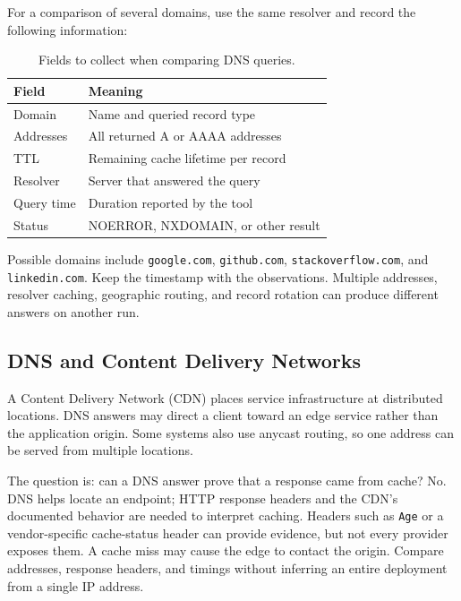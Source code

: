 \documentclass[journal]{IEEEtran}
\begin{document}
For a comparison of several domains, use the same resolver and record the following information:
\begin{table}[t]
\centering
\caption{Fields to collect when comparing DNS queries.}
\begin{tabularx}{\columnwidth}{@{}lX@{}}
\toprule
Field & Meaning \\
\midrule
Domain & Name and queried record type \\
Addresses & All returned A or AAAA addresses \\
TTL & Remaining cache lifetime per record \\
Resolver & Server that answered the query \\
Query time & Duration reported by the tool \\
Status & NOERROR, NXDOMAIN, or other result \\
\bottomrule
\end{tabularx}
\end{table}
Possible domains include \texttt{google.com}, \texttt{github.com}, \texttt{stackoverflow.com}, and \texttt{linkedin.com}. Keep the timestamp with the observations. Multiple addresses, resolver caching, geographic routing, and record rotation can produce different answers on another run.

\subsection{DNS and Content Delivery Networks}
A Content Delivery Network (CDN) places service infrastructure at distributed locations. DNS answers may direct a client toward an edge service rather than the application origin. Some systems also use anycast routing, so one address can be served from multiple locations.

The question is: can a DNS answer prove that a response came from cache? No. DNS helps locate an endpoint; HTTP response headers and the CDN's documented behavior are needed to interpret caching. Headers such as \texttt{Age} or a vendor-specific cache-status header can provide evidence, but not every provider exposes them. A cache miss may cause the edge to contact the origin. Compare addresses, response headers, and timings without inferring an entire deployment from a single IP address.
\end{document}
